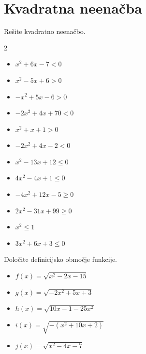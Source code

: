     



\newpage
    \section{Kvadratna neenačba}


\newpage

    

        \begin{naloga}
            Rešite kvadratno neenačbo.
            
            \begin{multicols}{2}
                
            
                \begin{itemize}
                    \item $ x^2+6x-7<0 $ 
                    \item $ x^2-5x+6>0 $ 
                    \item $ -x^2+5x-6>0 $ 
                    \item $ -2x^2+4x+70<0 $ 
                    \item $ x^2+x+1>0 $ 
                    \item $ -2x^2+4x-2<0 $

                    \item $ x^2-13x+12\leq 0 $ 
                    \item $ 4x^2-4x+1\leq 0 $ 
                    \item $ -4x^2+12x-5\geq 0 $ 
                    \item $ 2x^2-31x+99\geq 0 $ 
                    \item $ x^2\leq 1 $ 
                    \item $ 3x^2+6x+3\leq 0 $
                \end{itemize}

            \end{multicols}
        \end{naloga}
    



    

            \begin{naloga}
                Določite definicijsko območje funkcije.
                                
                    \begin{itemize}
                        \item $ f(x)= \sqrt{x^2-2x-15} $ 
                        \item $ g(x)= \sqrt{-2x^2+5x+3} $ 
                        \item $ h(x)= \sqrt{10x-1-25x^2} $ 
                        \item $ i(x)= \sqrt{-\left(x^2+10x+2\right)} $
                        \item $ j(x)= \sqrt{x^2-4x-7} $ 

                    \end{itemize}

            \end{naloga}



